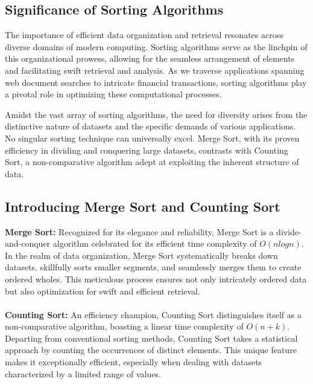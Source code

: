 \documentclass[12pt,twocolumn]{article}
\begin{document}
\subsection{Significance of Sorting Algorithms}
The importance of efficient data organization and retrieval resonates across diverse domains of modern computing. Sorting algorithms serve as the linchpin of this organizational prowess, allowing for the seamless arrangement of elements and facilitating swift retrieval and analysis. As we traverse applications spanning web document searches to intricate financial transactions, sorting algorithms play a pivotal role in optimizing these computational processes.

Amidst the vast array of sorting algorithms, the need for diversity arises from the distinctive nature of datasets and the specific demands of various applications. No singular sorting technique can universally excel. Merge Sort, with its proven efficiency in dividing and conquering large datasets, contrasts with Counting Sort, a non-comparative algorithm adept at exploiting the inherent structure of data.

\subsection{Introducing Merge Sort and Counting Sort}
\textbf{Merge Sort:} Recognized for its elegance and reliability, Merge Sort is a divide-and-conquer algorithm celebrated for its efficient time complexity of \(O(n log n)\). In the realm of data organization, Merge Sort systematically breaks down datasets, skillfully sorts smaller segments, and seamlessly merges them to create ordered wholes. This meticulous process ensures not only intricately ordered data but also optimization for swift and efficient retrieval.
\\
\\
\textbf{Counting Sort:} An efficiency champion, Counting Sort distinguishes itself as a non-comparative algorithm, boasting a linear time complexity of \(O(n + k)\). Departing from conventional sorting methods, Counting Sort takes a statistical approach by counting the 
occurrences of distinct elements. This unique feature makes it exceptionally efficient, especially when dealing with datasets characterized by a limited range of values.
\end{document}
